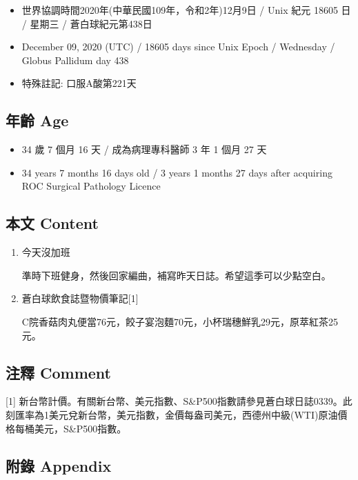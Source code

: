 \documentclass[
]{article}
\providecommand{\tightlist}{%
  \setlength{\itemsep}{0pt}\setlength{\parskip}{0pt}}
\begin{document}
\begin{itemize}
\tightlist
\item
  世界協調時間2020年(中華民國109年，令和2年)12月9日 / Unix 紀元 18605 日
  / 星期三 / 蒼白球紀元第438日
\item
  December 09, 2020 (UTC) / 18605 days since Unix Epoch / Wednesday /
  Globus Pallidum day 438
\item
  特殊註記: 口服A酸第221天
\end{itemize}

\hypertarget{ux5e74ux9f61-age-8}{%
\subsection{年齡 Age}\label{ux5e74ux9f61-age-8}}

\begin{itemize}
\tightlist
\item
  34 歲 7 個月 16 天 / 成為病理專科醫師 3 年 1 個月 27 天
\item
  34 years 7 months 16 days old / 3 years 1 months 27 days after
  acquiring ROC Surgical Pathology Licence
\end{itemize}

\hypertarget{ux672cux6587-content-8}{%
\subsection{本文 Content}\label{ux672cux6587-content-8}}

\begin{enumerate}
\def\labelenumi{\arabic{enumi}.}
\item
  今天沒加班

  準時下班健身，然後回家編曲，補寫昨天日誌。希望這季可以少點空白。
\item
  蒼白球飲食誌暨物價筆記{[}1{]}

  C院香菇肉丸便當76元，餃子宴泡麵70元，小杯瑞穗鮮乳29元，原萃紅茶25元。
\end{enumerate}

\hypertarget{ux6ce8ux91cb-comment-8}{%
\subsection{注釋 Comment}\label{ux6ce8ux91cb-comment-8}}

{[}1{]}
新台幣計價。有關新台幣、美元指數、S\&P500指數請參見蒼白球日誌0339。此刻匯率為1美元兌新台幣，美元指數，金價每盎司美元，西德州中級(WTI)原油價格每桶美元，S\&P500指數。

\hypertarget{ux9644ux9304-appendix-8}{%
\subsection{附錄 Appendix}\label{ux9644ux9304-appendix-8}}
\end{document}
